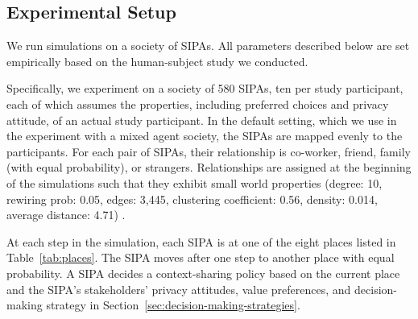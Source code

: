 \subsection{Experimental Setup}


We run simulations on a society of \locationapp SIPAs. All parameters described below are set empirically based on the human-subject study we conducted.

Specifically, we experiment on a society of 580 SIPAs, ten per study participant, each of which assumes the properties, including preferred choices and privacy attitude, of an actual study participant. In the default setting, which we use in the experiment with a mixed agent society, the SIPAs are mapped evenly to the participants. For each pair of SIPAs, their relationship is co-worker, friend, family (with equal probability), or strangers.
Relationships are assigned at the beginning of the simulations such that they exhibit small world properties (degree: 10, rewiring prob: 0.05, edges: 3,445, clustering coefficient: 0.56, density: 0.014, average distance: 4.71) \citep{Watts+Strogatz-98}. 


At each step in the simulation, each SIPA is at one of the eight places listed in Table~\ref{tab:places}. The SIPA moves after one step to another place with equal probability. A SIPA decides a context-sharing policy based on the current place and the SIPA's stakeholders' privacy attitudes, value preferences, and decision-making strategy in Section~\ref{sec:decision-making-strategies}.  


